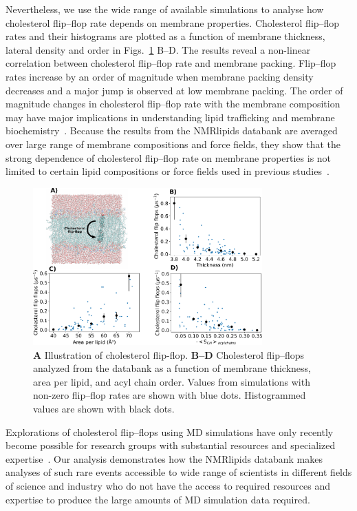 \documentclass[fleqn,10pt]{wlscirep}
\begin{document}
Nevertheless, we use the wide range of available simulations to analyse how cholesterol flip--flop rate depends on membrane properties. Cholesterol flip--flop rates and their histograms are plotted as a function of membrane thickness, lateral density and order in Figs.~\ref{fig:flip-flops} B--D. The results reveal a non-linear correlation between cholesterol flip--flop rate and membrane packing. Flip--flop rates increase by an order of magnitude when membrane packing density decreases and a major jump is observed at low membrane packing. The order of magnitude changes in cholesterol flip--flop rate with the membrane composition may have major implications in understanding lipid trafficking and membrane biochemistry~\cite{gu19,baral20}. Because the results from the NMRlipids databank are averaged over large range of membrane compositions and force fields, they show that the strong dependence of cholesterol flip--flop rate on membrane properties is not limited to certain lipid compositions or force fields used in previous studies~\cite{gu19,javanainen19,baral20}.

\begin{figure}[htb]
    \centering
    \includegraphics[width=88mm]{Figures/CholFlipFlops.pdf}
    \caption{\textbf{A} Illustration of cholesterol flip-flop.  
      \textbf{B--D} Cholesterol flip--flops analyzed from the databank as a function of membrane thickness, area per lipid, and acyl chain order. Values from simulations with non-zero flip--flop rates are shown with blue dots. Histogrammed values are shown with black dots.
    }
    \label{fig:flip-flops}
\end{figure}

Explorations of cholesterol flip--flops using MD simulations have only recently become possible for research groups with substantial resources and specialized expertise~\cite{gu19,javanainen19,baral20}. Our analysis demonstrates how the NMRlipids databank makes analyses of such rare events accessible to wide range of scientists in different fields of science and industry who do not have the access to required resources and expertise to produce the large amounts of MD simulation data required. 
\end{document}
